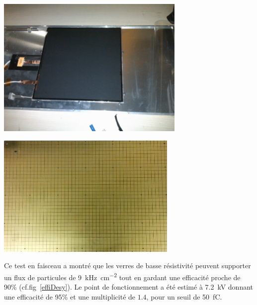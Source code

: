 \noindent
\begin{minipage}[th!]{.48\textwidth}
\centering
\includegraphics[width=0.68\textwidth]{GLA/chambre.png}
\label{chambre}
\end{minipage}%
\hfill
\begin{minipage}[th!]{.48\textwidth}
	\centering
\includegraphics[width=0.65\textwidth]{GLA/cellules.jpg}
\label{cellule}
\end{minipage}

Ce test en faisceau a montré que les verres de basse résistivité peuvent supporter un flux de particules de \SI{9}{\kilo\hertz\per\square\centi\meter} tout en gardant une efficacité proche de 90\% (cf.fig~\ref{effiDesy}). Le point de fonctionnement a été estimé à \SI{7.2}{\kilo\volt} donnant une efficacité de 95\% et une multiplicité de $1.4$, pour un seuil de \SI{50}{\femto\coulomb}. 

